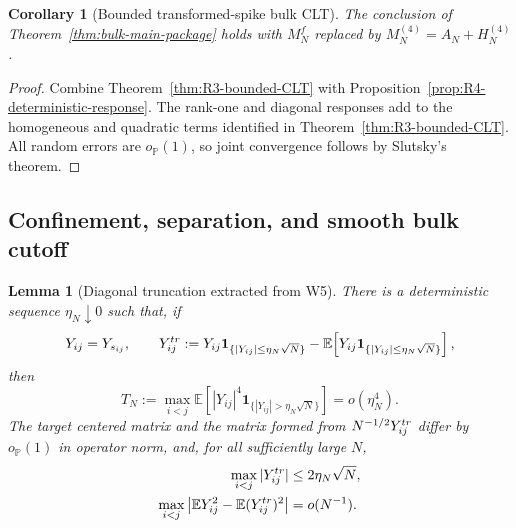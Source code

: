 \documentclass[10pt,a4paper]{amsart}
\newtheorem{lemma}[theorem]{Lemma}
\newtheorem{corollary}[theorem]{Corollary}
\newcommand{\E}{\mathbb E}
\newcommand{\one}{\mathbf 1}
\begin{document}
\begin{corollary}[Bounded transformed-spike bulk CLT]
\label{cor:R4-bounded-full-CLT}
The conclusion of Theorem~\ref{thm:bulk-main-package} holds with
\(M_N^f\) replaced by \(M_N^{(4)}=A_N+H_N^{(4)}\).
\end{corollary}

\begin{proof}
Combine Theorem~\ref{thm:R3-bounded-CLT} with
Proposition~\ref{prop:R4-deterministic-response}.  The rank-one and diagonal
responses add to the homogeneous and quadratic terms identified in
Theorem~\ref{thm:R3-bounded-CLT}.
All random errors are \(o_{\mathbb P}(1)\), so joint convergence follows by
Slutsky's theorem.
\end{proof}

\subsection{Confinement, separation, and smooth bulk cutoff}

\begin{lemma}[Diagonal truncation extracted from W5]
\label{lem:R4-diagonal-truncation}
There is a deterministic sequence \(\eta_N\downarrow0\) such that, if
\[
 Y_{ij}=Y_{s_{ij}},\qquad
 Y_{ij}^{\rm tr}
 :=Y_{ij}\one_{\{|Y_{ij}|\le\eta_N\sqrt N\}}
 -\E\!\left[Y_{ij}\one_{\{|Y_{ij}|\le\eta_N\sqrt N\}}\right],
\]
then
\begin{equation}\label{eq:R4-uniform-tail-choice}
 T_N:=\max_{i<j}
 \E\!\left[|Y_{ij}|^4
 \one_{\{|Y_{ij}|>\eta_N\sqrt N\}}\right]
 =o(\eta_N^4).
\end{equation}
The target centered matrix and the matrix formed from
\(N^{-1/2}Y_{ij}^{\rm tr}\) differ by \(o_{\mathbb P}(1)\) in operator norm,
and, for all sufficiently large \(N\),
\begin{align}
 \max_{i<j}|Y_{ij}^{\rm tr}|
 &\le2\eta_N\sqrt N,\label{eq:R4-trunc-max}\\
 \max_{i<j}\left|
 \E Y_{ij}^2-\E(Y_{ij}^{\rm tr})^2
 \right|&=o(N^{-1}).\label{eq:R4-trunc-variance}
\end{align}
\end{lemma}
\end{document}
